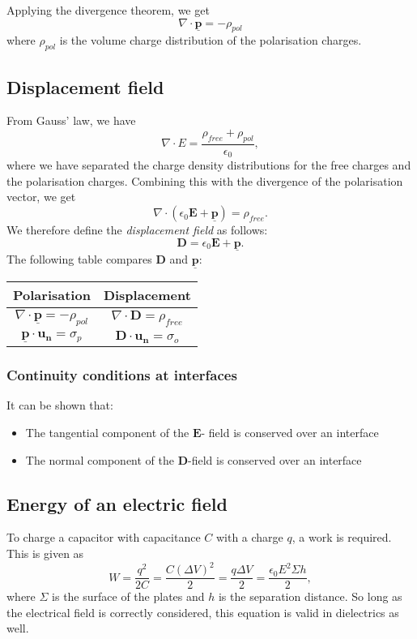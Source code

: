 \documentclass[a4paper, 12pt]{article}
\renewcommand{\vec}[1]{\mathbf{#1}}
\newcommand{\E}{\ensuremath{\vec{E}}}
\newcommand{\e}{\ensuremath{\epsilon_0}}
\newcommand{\p}{\ensuremath{\vec{\underline{p}}}}
\newcommand{\D}{\ensuremath{\vec{D}}}
\begin{document}
        Applying the divergence theorem, we get
        \begin{equation}
            \nabla \cdot \p = - \rho_{pol}
        \end{equation}
        where $\rho_{pol}$ is the volume charge distribution of the polarisation charges.
\subsection{Displacement field}
    From Gauss' law, we have 
    \begin{equation*}
        \nabla \cdot E = \frac{\rho_{free} + \rho_{pol}}{\e},
    \end{equation*}
    where we have separated the charge density distributions for the free charges and the polarisation charges. Combining this with the divergence of the polarisation vector, we get 
    \begin{equation*}
        \nabla \cdot \left(\e\E + \p\right) = \rho_{free}.
    \end{equation*}
    We therefore define the \textit{displacement field} as follows:
    \begin{equation}
        \D = \e\E + \p.
    \end{equation}
    The following table compares $\D$ and $\p$:
    \begin{center}
        \begin{tabular}{ c|c } 
        Polarisation & Displacement \\
        \hline
         $\nabla \cdot \p = -\rho_{pol}$ & $\nabla \cdot \D = \rho_{free}$ \\[6px] 
         $\p \cdot \vec{u_n} = \sigma_p$ & $\D \cdot \vec{u_n} = \sigma_o$
        \end{tabular}
    \end{center}
    \subsubsection{Continuity conditions at interfaces}
        It can be shown that:
        \begin{itemize}
            \item The tangential component of the $\E$- field is conserved over an interface
            \item The normal component of the $\D$-field is conserved over an interface
        \end{itemize}
\subsection{Energy of an electric field}
    To charge a capacitor with capacitance $C$ with a charge $q$, a work is required. This is given as 
    \begin{equation}
        W = \frac{q^2}{2C} = \frac{C(\Delta V)^2}{2} = \frac{q\Delta V}{2} = \frac{\e E^2\Sigma h}{2},
    \end{equation}
    where $\Sigma$ is the surface of the plates and $h$ is the separation distance. So long as the electrical field is correctly considered, this equation is valid in dielectrics as well.
    
\end{document}

